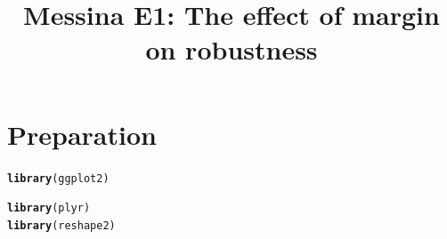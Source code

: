 \documentclass{article}\usepackage[]{graphicx}\usepackage[]{color}
\makeatletter
\newcommand{\hlstd}[1]{\textcolor[rgb]{0.345,0.345,0.345}{#1}}%
\newcommand{\hlkwd}[1]{\textcolor[rgb]{0.737,0.353,0.396}{\textbf{#1}}}%
\newenvironment{kframe}{%
 \def\at@end@of@kframe{}%
 \ifinner\ifhmode%
  \def\at@end@of@kframe{\end{minipage}}%
  \begin{minipage}{\columnwidth}%
 \fi\fi%
 \def\FrameCommand##1{\hskip\@totalleftmargin \hskip-\fboxsep
 \colorbox{shadecolor}{##1}\hskip-\fboxsep
     \hskip-\linewidth \hskip-\@totalleftmargin \hskip\columnwidth}%
 \MakeFramed {\advance\hsize-\width
   \@totalleftmargin\z@ \linewidth\hsize
   \@setminipage}}%
 {\par\unskip\endMakeFramed%
 \at@end@of@kframe}
\newenvironment{knitrout}{}{} %
\makeatother
\begin{document}
\title{Messina E1: The effect of margin on robustness}
\maketitle


\section{Preparation}
\begin{knitrout}
\color{fgcolor}\begin{kframe}
\begin{alltt}
\hlkwd{library}\hlstd{(ggplot2)}
\end{alltt}


{\ttfamily\noindent\itshape\color{messagecolor}{\#\# Loading required package: methods}}\begin{alltt}
\hlkwd{library}\hlstd{(plyr)}
\hlkwd{library}\hlstd{(reshape2)}
\end{alltt}
\end{kframe}
\end{knitrout}
\end{document}
